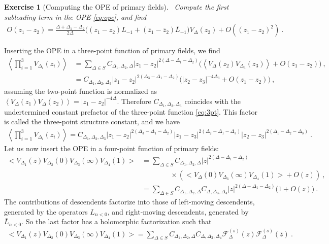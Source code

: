 \documentclass[12pt, a4paper]{article}
\theoremstyle{break}
\newtheorem{exo}{Exercise}[section]
\begin{document}
\begin{exo}[Computing the OPE of primary fields]
~\label{exo:ope}
 Compute the first subleading term in the OPE \eqref{eq:ope}, and find
 \begin{align}
  O(z_1-z_2) = \frac{\Delta+\Delta_1-\Delta_2}{2\Delta} \Big( (z_1-z_2)L_{-1}+(\bar z_1-\bar z_2)\bar L_{-1}\Big) V_{\Delta}(z_2) + O((z_1-z_2)^2)\ .
 \end{align}
\end{exo}

Inserting the OPE in a three-point function of primary fields, we find 
\begin{align}
 \left<\prod_{i=1}^3 V_{\Delta_i}(z_i) \right> & = \sum_{\Delta\in S}C_{\Delta_1,\Delta_2,\Delta} |z_1-z_2|^{2(\Delta-\Delta_1-\Delta_2)}
 \Big(\left< V_{\Delta}(z_2) V_{\Delta_3}(z_3) \right> +O(z_1-z_2)\Big) \ ,
 \\
& =  C_{\Delta_1,\Delta_2,\Delta_3} |z_1-z_2|^{2(\Delta_3-\Delta_1-\Delta_2)} \Big( |z_2-z_3|^{-4\Delta_3} + O(z_1-z_2)\Big)\ ,
\end{align}
assuming the two-point function is normalized as $\left< V_{\Delta}(z_1)V_{\Delta}(z_2) \right> = |z_1-z_2|^{-4\Delta}$.
Therefore $C_{\Delta_1,\Delta_2,\Delta_3}$ coincides with the undertermined constant prefactor of the three-point function \eqref{eq:3pt}. This factor is called the three-point structure constant, and we have
\begin{align}
 \left<\prod_{i=1}^3 V_{\Delta_i}(z_i) \right> = C_{\Delta_1,\Delta_2,\Delta_3} |z_1-z_2|^{2(\Delta_3-\Delta_1-\Delta_2)} |z_1-z_3|^{2(\Delta_2-\Delta_1-\Delta_3)} |z_2-z_3|^{2(\Delta_1-\Delta_2-\Delta_3)}\ .
\end{align}
Let us now insert the OPE in a four-point function of primary fields:
\begin{align}
 \Big<V_{\Delta_1}(z)V_{\Delta_2}(0)V_{\Delta_3}(\infty)V_{\Delta_4}(1)\Big>
 &= \sum_{\Delta\in S} C_{\Delta_1,\Delta_2,\Delta} |z|^{2(\Delta-\Delta_1-\Delta_2)}
 \nonumber
\\ & \qquad \qquad \times 
 \left(\Big< V_\Delta(0)V_{\Delta_3}(\infty)V_{\Delta_4}(1)\Big> + O(z)\right) \ ,
 \\
 &=  \sum_{\Delta\in S} C_{\Delta_1,\Delta_2,\Delta} C_{\Delta,\Delta_3,\Delta_4}
|z|^{2(\Delta-\Delta_1-\Delta_2)} \Big(1 +O(z) \Big)\ .
\end{align}
The contributions of descendents factorize into those of left-moving descendents, generated by the operators $L_{n<0}$, and right-moving descendents, generated by $\bar L_{n<0}$. So the last factor has a holomorphic factorization such that 
\begin{align}
\Big<V_{\Delta_1}(z)V_{\Delta_2}(0)V_{\Delta_3}(\infty)V_{\Delta_4}(1)\Big>
 =\sum_{\Delta\in S} C_{\Delta_1,\Delta_2,\Delta} C_{\Delta,\Delta_3,\Delta_4}  \mathcal{F}^{(s)}_\Delta(z) \mathcal{F}^{(s)}_\Delta(\bar z)\ .
 \label{sdec}
\end{align}
\end{document}
